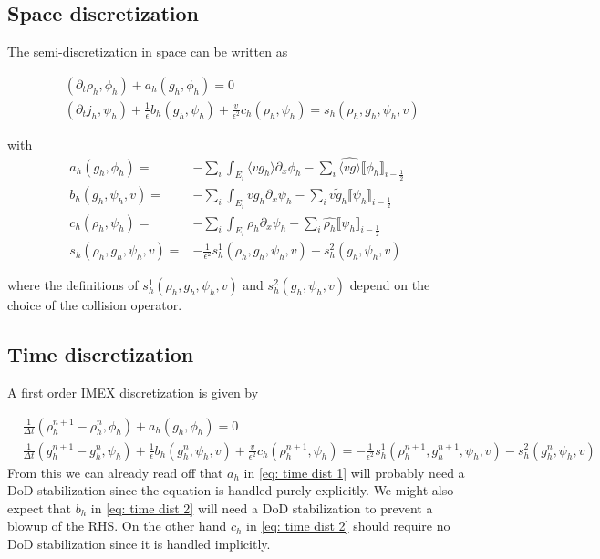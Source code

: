 \documentclass[]{article}
\begin{document}
\subsection{Space discretization}

The semi-discretization in space can be written as

\begin{subequations}
\begin{align}
& (\partial_t \rho_h, \phi_h) + a_h(g_h, \phi_h) = 0\\
& (\partial_t j_h, \psi_h) + \frac{1}{\epsilon}b_h(g_h, \psi_h) + \frac{v}{\epsilon^2}c_h(\rho_h, \psi_h) = s_h(\rho_h, g_h, \psi_h, v)
\end{align}
\end{subequations}

with
\begin{subequations}
\begin{align}
a_h(g_h, \phi_h) = & - \sum_i \int_{E_i} \langle v g_h \rangle \partial_x \phi_h - \sum_{i} \widehat{\langle v g \rangle} \llbracket \phi_h \rrbracket_{i-\frac{1}{2}} \\
b_h(g_h, \psi_h, v) = & - \sum_i \int_{E_i} v g_h \partial_x \psi_h - \sum_i \widetilde{v g_h} \llbracket \psi_h \rrbracket_{i - \frac{1}{2}}\\
c_h(\rho_h, \psi_h) = & - \sum_i \int_{E_i} \rho_h \partial_x \psi_h - \sum_i \widehat{ \rho_h} \llbracket \psi_h \rrbracket_{i - \frac{1}{2}} \\
s_h(\rho_h, g_h, \psi_h, v) = & - \frac{1}{\epsilon^2}s_h^1(\rho_h, g_h, \psi_h, v) - s_h^2(g_h, \psi_h, v)
\end{align}
\end{subequations}

where the definitions of $s_h^1(\rho_h, g_h, \psi_h, v)$ and $s_h^2(g_h, \psi_h, v)$ depend on the choice of the collision operator.

\subsection{Time discretization}

A first order IMEX discretization is given by

\begin{subequations}
\begin{align}
& \frac{1}{\Delta t} (\rho_h^{n+1} - \rho_h^n, \phi_h) + a_h(g_h, \phi_h) = 0 \label{eq: time dist 1}\\
& \frac{1}{\Delta t} (g_h^{n+1} - g_h^n, \psi_h) + \frac{1}{\epsilon} b_h(g_h^n, \psi_h, v) + \frac{v}{\epsilon^2} c_h(\rho_h^{n+1}, \psi_h) = - \frac{1}{\epsilon^2}s_h^1(\rho_h^{n+1}, g_h^{n+1}, \psi_h, v) - s_h^2(g_h^n, \psi_h, v) \label{eq: time dist 2}
\end{align}
\end{subequations}
From this we can already read off that $a_h$ in \eqref{eq: time dist 1} will probably need a DoD stabilization since the equation is handled purely explicitly. We might also expect that $b_h$ in \eqref{eq: time dist 2} will need a DoD stabilization to prevent a blowup of the RHS. On the other hand $c_h$ in \eqref{eq: time dist 2} should require no DoD stabilization since it is handled implicitly.
\end{document}
